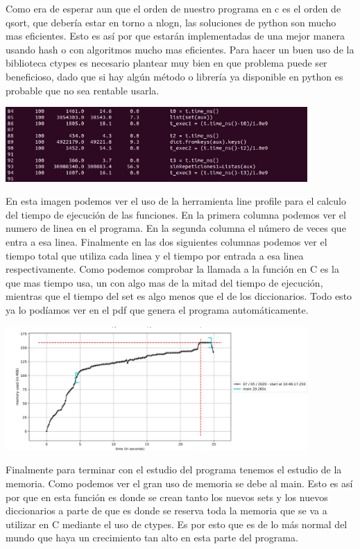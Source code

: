 \documentclass{article}
\begin{document}
Como era de esperar aun que el orden de nuestro programa en c es el orden de qsort, que debería estar en torno a nlogn, las soluciones de python son mucho mas eficientes. Esto es así por que estarán implementadas de una mejor manera usando hash o con algoritmos mucho mas eficientes. Para hacer un buen uso de la biblioteca ctypes es necesario plantear muy bien en que problema puede ser beneficioso, dado que si hay algún método o librería ya disponible en python es probable que no sea rentable usarla.

\includegraphics[width=11.5cm]{Line_profile.PNG}

En esta imagen podemos ver el uso de la herramienta line profile para el calculo del tiempo de ejecución de las funciones. En la primera columna podemos ver el numero de linea en el programa. En la segunda columna el número de veces que entra a esa linea. Finalmente en las dos siguientes columnas podemos ver el tiempo total que utiliza cada linea y el tiempo por entrada a esa linea respectivamente. Como podemos comprobar la llamada a la función en C es la que mas tiempo usa, un con algo mas de la mitad del tiempo de ejecución, mientras que el tiempo del set es algo menos que el de los diccionarios. Todo esto ya lo podíamos ver en el pdf que genera el programa automáticamente.

\includegraphics[width=11.5cm]{memory_profile.PNG}

Finalmente para terminar con el estudio del programa tenemos el estudio de la memoria. Como podemos ver el gran uso de memoria se debe al main. Esto es así por que en esta función es donde se crean tanto los nuevos sets y los nuevos diccionarios a parte de que es donde se reserva toda la memoria que se va a utilizar en C mediante el uso de ctypes. Es por esto que es de lo más normal del mundo que haya un crecimiento tan alto en esta parte del programa.
\end{document}
